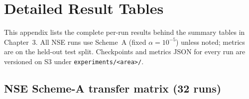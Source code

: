 {\small
\appendix

\section{Detailed Result Tables}

This appendix lists the complete per-run results behind the summary tables in Chapter~3. All NSE runs use Scheme~A (fixed $\alpha{=}10^{-5}$) unless noted; metrics are on the held-out test split. Checkpoints and metrics JSON for every run are versioned on S3 under \texttt{experiments/<area>/}.

\subsection{NSE Scheme-A transfer matrix (32 runs)}

}
